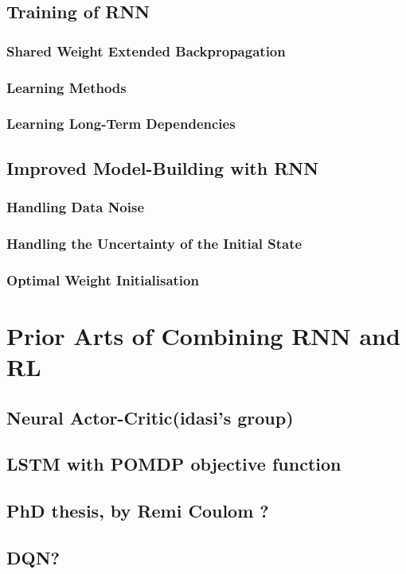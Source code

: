 \documentclass[officiallayout]{tktla}
\begin{document}
\section{Training of RNN}
\subsection{Shared Weight Extended Backpropagation}
\subsection{Learning Methods}
\subsection{Learning Long-Term Dependencies}

\section{Improved Model-Building with RNN} 
\subsection{Handling Data Noise} 
\subsection{Handling the Uncertainty of the Initial State}
\subsection{Optimal Weight Initialisation}

\chapter{Prior Arts of Combining RNN and RL}
\section{Neural Actor-Critic(idasi's group)}
\section{LSTM with POMDP objective function}
\section{PhD thesis, by Remi Coulom ?}

\section{DQN?}
\end{document}
